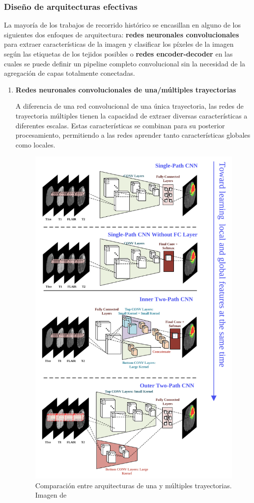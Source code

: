 			\subsubsection{Diseño de arquitecturas efectivas}
			
			La mayoría de los trabajos de recorrido histórico se encasillan en alguno de los siguientes dos enfoques de arquitectura: \textbf{redes neuronales convolucionales} para extraer características de la imagen y clasificar los píxeles de la imagen según las etiquetas de los tejidos posibles o \textbf{redes encoder-decoder} en las cuales se puede definir un pipeline completo convolucional sin la necesidad de la agregación de capas totalmente conectadas.
			
			\begin{enumerate}
					
				\item \textbf{Redes neuronales convolucionales de una/múltiples trayectorias}
					
					
				A diferencia de una red convolucional de una única trayectoria, las redes de trayectoria múltiples tienen la capacidad de extraer diversas características a diferentes escalas. Estas características se combinan para su posterior procesamiento, permitiendo a las redes aprender tanto características globales como locales. 
				
				\begin{figure}[!h]
					\centering
					\includegraphics[width=0.5\linewidth]{imagenes/comparisonsinglemultipleCNN.png}
					\caption{Comparación entre arquitecturas de una y múltiples trayectorias. Imagen de \cite{liu2023deep}}
				\end{figure}
				

\end{enumerate}
